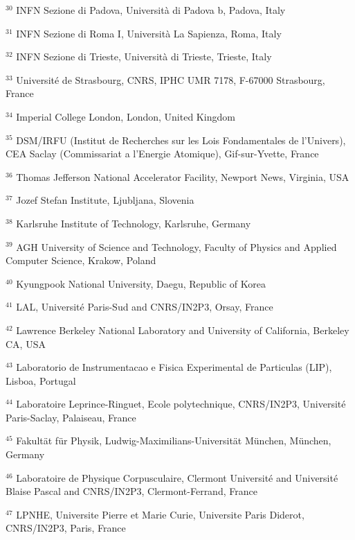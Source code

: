\par {\footnotesize $^{30}$ INFN Sezione di Padova, Università di Padova b, Padova, Italy}
\par {\footnotesize $^{31}$ INFN Sezione di Roma I, Università La Sapienza, Roma, Italy}
\par {\footnotesize $^{32}$ INFN Sezione di Trieste, Università di Trieste, Trieste, Italy}
\par {\footnotesize $^{33}$ Université de Strasbourg, CNRS, IPHC UMR 7178, F-67000 Strasbourg, France}
\par {\footnotesize $^{34}$ Imperial College London, London, United Kingdom}
\par {\footnotesize $^{35}$ DSM/IRFU (Institut de Recherches sur les Lois Fondamentales de l’Univers), CEA Saclay (Commissariat a l’Energie Atomique), Gif-sur-Yvette, France}
\par {\footnotesize $^{36}$ Thomas Jefferson National Accelerator Facility, Newport News, Virginia, USA}
\par {\footnotesize $^{37}$ Jozef Stefan Institute, Ljubljana, Slovenia}
\par {\footnotesize $^{38}$ Karlsruhe Institute of Technology, Karlsruhe, Germany}
\par {\footnotesize $^{39}$ AGH University of Science and Technology, Faculty of Physics and Applied Computer Science, Krakow, Poland}
\par {\footnotesize $^{40}$ Kyungpook National University, Daegu, Republic of Korea}
\par {\footnotesize $^{41}$ LAL, Université Paris-Sud and CNRS/IN2P3, Orsay, France}
\par {\footnotesize $^{42}$ Lawrence Berkeley National Laboratory and University of California, Berkeley CA, USA}
\par {\footnotesize $^{43}$ Laboratorio de Instrumentacao e Fisica Experimental de Particulas (LIP), Lisboa, Portugal}
\par {\footnotesize $^{44}$ Laboratoire Leprince-Ringuet, Ecole polytechnique, CNRS/IN2P3, Université Paris-Saclay, Palaiseau, France}
\par {\footnotesize $^{45}$ Fakultät für Physik, Ludwig-Maximilians-Universität München, München, Germany}
\par {\footnotesize $^{46}$ Laboratoire de Physique Corpusculaire, Clermont Université and Université Blaise Pascal and CNRS/IN2P3, Clermont-Ferrand, France}
\par {\footnotesize $^{47}$ LPNHE, Universite Pierre et Marie Curie, Universite Paris Diderot, CNRS/IN2P3, Paris, France}
